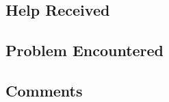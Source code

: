 \documentclass[11pt,a4paper,notitlepage]{article}
\newcommand{\explanation}[1]{}  %
\begin{document}
\subsection{Help Received}
\explanation{
Describe whatever help (if any) that you received.
Don't include readings, lectures, and classes, but do
include any help from people (including course staff, lab TAs,
classmates, and friends) and attribute them by name.}


\subsection{Problem Encountered}
\explanation{
Describe any serious problems you encountered.                    }



\subsection{Comments}
\explanation{
List any other comments here. Feel free to provide any feedback   
on how much you learned from doing the assignment, and whether    
you enjoyed doing it.}
\end{document}
